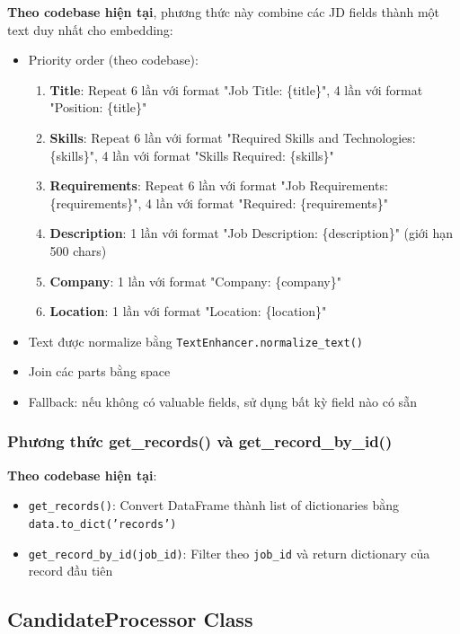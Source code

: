 \textbf{Theo codebase hiện tại}, phương thức này combine các JD fields thành một text duy nhất cho embedding:
\begin{itemize}
    \item Priority order (theo codebase):
    \begin{enumerate}
        \item \textbf{Title}: Repeat 6 lần với format "Job Title: \{title\}", 4 lần với format "Position: \{title\}"
        \item \textbf{Skills}: Repeat 6 lần với format "Required Skills and Technologies: \{skills\}", 4 lần với format "Skills Required: \{skills\}"
        \item \textbf{Requirements}: Repeat 6 lần với format "Job Requirements: \{requirements\}", 4 lần với format "Required: \{requirements\}"
        \item \textbf{Description}: 1 lần với format "Job Description: \{description\}" (giới hạn 500 chars)
        \item \textbf{Company}: 1 lần với format "Company: \{company\}"
        \item \textbf{Location}: 1 lần với format "Location: \{location\}"
    \end{enumerate}
    \item Text được normalize bằng \texttt{TextEnhancer.normalize\_text()}
    \item Join các parts bằng space
    \item Fallback: nếu không có valuable fields, sử dụng bất kỳ field nào có sẵn
\end{itemize}

\subsubsection{Phương thức get\_records() và get\_record\_by\_id()}

\textbf{Theo codebase hiện tại}:
\begin{itemize}
    \item \texttt{get\_records()}: Convert DataFrame thành list of dictionaries bằng \texttt{data.to\_dict('records')}
    \item \texttt{get\_record\_by\_id(job\_id)}: Filter theo \texttt{job\_id} và return dictionary của record đầu tiên
\end{itemize}

\subsection{CandidateProcessor Class}

